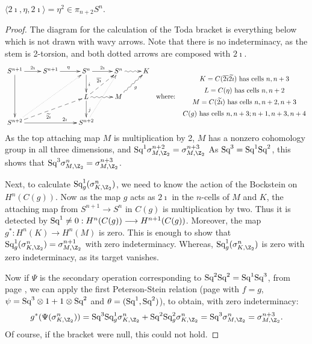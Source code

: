 \documentclass[11pt]{article}
\begin{document}
\begin{prop*}[3]
$\langle 2\imath,\eta,2\imath\rangle=\eta^2\in\pi_{n+2}S^n$.
\end{prop*}
\begin{proof}
The diagram for the calculation of the Toda bracket is everything below which is
not drawn with wavy arrows. Note that there is no indeterminacy, as the \SECOND
stem is 2-torsion, and both dotted arrows are composed with $2\imath$.
\[\xymatrix{
\ar[dd]S^{n+1}\ar[r]^{2\imath}&
S^{n+1}\ar[r]^\eta&
S^n\ar[d]^i\ar[r]^{2\imath}&
S^n\ar@{~>}[r]&
K\\
&&L\ar[d]^j\ar@{-->}[ur]^{\overline{2\imath}}\ar@{~>}[r]&M\ar@{~>}[ur]_g\\
S^{n+2}\ar@{-->}[rru]_(.45){\widetilde{2\imath}}
\ar@{.>}[rruu]\ar[rr]^(.7){2\imath}&&S^{n+2}\ar@{.>}[ruu]
}
\raisebox{-1.3cm}{\text{ \ where: \ }}
\raisebox{-.4cm}{$
\xymatrix@R=0cm{
K=C(\overline{2\imath}\widetilde{2\imath})\text{ has cells }n,n+3\\
L=C(\eta)\text{ has cells }n,n+2\\
M=C(\widetilde{2\imath})\text{ has cells }n,n+2,n+3\\
C(g)\text{ has cells }n,n+3; n+1,n+3,n+4
}$}
\]
As the top attaching map $M$ is multiplication by 2, $M$ has a nonzero
cohomology group in all three dimensions, and
$\Squ^1\sigma^{n+2}_{M,\Z_2}=\sigma^{n+3}_{M,\Z_2}$ As $\textup{Sq}^3=\textup{Sq}^1\textup{Sq}^2$,
this shows that $\Squ^3\sigma^{n}_{M,\Z_2}=\sigma^{n+3}_{M,\Z_2}$.

Next, to calculate $\Squ^1_g(\sigma^n_{K,\Z_2})$, we need to know the action of
the Bockstein on $H^n(C(g))$. Now as the map $g$ acts as $2\imath$ in the
$n$-cells of $M$ and $K$, the attaching map from $S^{n+1}\to S^n$ in $C(g)$ is
multiplication by two. Thus it is detected by $\textup{Sq}^1\neq0:H^n(C(g))\longrightarrow
H^{n+1}(C(g))$. Moreover, the map $g^*:H^n(K)\to H^n(M)$ is zero. This is enough
to show that $\Squ^1_g(\sigma^n_{K,\Z_2})=\sigma^{n+1}_{M,\Z_2}$ with zero
indeterminacy. Whereas, $\Squ^1_g(\sigma^n_{K,\Z_2})$ is zero with zero
indeterminacy, as its target vanishes.

Now if $\Psi$ is the secondary operation corresponding to
$\textup{Sq}^2\textup{Sq}^2=\textup{Sq}^1\textup{Sq}^3$, from page \pageref{31is22}, we can apply the first
Peterson-Stein relation (page \pageref{PSfirst} with $f=g$,
$\psi=\textup{Sq}^3\otimes1+1\otimes\textup{Sq}^2$ and $\theta=(\textup{Sq}^1,\textup{Sq}^2)$), to obtain,
with zero indeterminacy:
\[g^*(\Psi(\sigma^n_{K,\Z_2}))=
\Squ^3\Squ_g^1\sigma^n_{K,\Z_2}+\Squ^2\Squ_g^2\sigma^n_{K,\Z_2}=
\Squ^3\sigma^{n}_{M,\Z_2}=\sigma^{n+3}_{M,\Z_2}.\]
Of course, if the bracket were null, this could not hold.
\end{proof}
\end{document}
